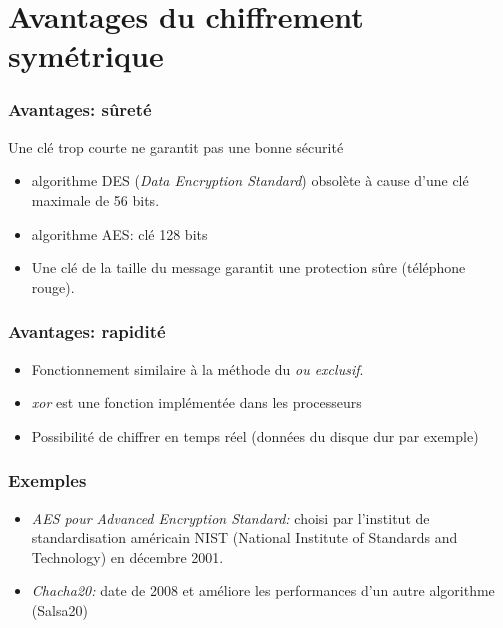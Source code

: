\documentclass[svgnames,11pt]{beamer}
\begin{document}
\section{Avantages du chiffrement symétrique}

\begin{frame}
    \frametitle{Avantages: sûreté}
    Une clé trop courte ne garantit pas une bonne sécurité
\begin{itemize}
    \item<1-> algorithme DES (\emph{Data Encryption Standard}) obsolète à cause d'une clé maximale de 56 bits.
    \item<2-> algorithme AES: clé 128 bits
    \item<3-> Une clé de la taille du message garantit une protection sûre (téléphone rouge).
    
\end{itemize}
    

\end{frame}

\begin{frame}
    \frametitle{Avantages: rapidité}
\begin{itemize}
    \item<1-> Fonctionnement similaire à la méthode du \emph{ou exclusif}.
    \item<2-> \emph{xor} est une fonction implémentée dans les processeurs
    \item <3-> Possibilité de chiffrer en temps réel (données du disque dur par exemple)
\end{itemize}

\end{frame}
\begin{frame}
    \frametitle{Exemples}

    \begin{itemize}
        \item \emph{AES pour Advanced Encryption Standard:} choisi par l'institut de standardisation américain NIST (National Institute of Standards and Technology) en décembre 2001.
        \item \emph{Chacha20:} date de 2008 et améliore les performances d'un autre algorithme (Salsa20)
    \end{itemize}

\end{frame}
\end{document}
